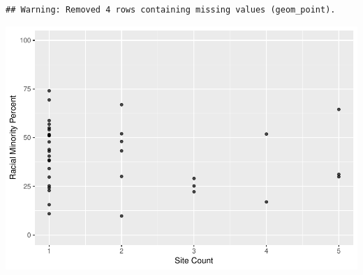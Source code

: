 \documentclass[12pt,]{article}
\begin{document}
\begin{verbatim}
## Warning: Removed 4 rows containing missing values (geom_point).
\end{verbatim}

\includegraphics{Project_Template_files/figure-latex/final visualizations-7.pdf}
\end{document}
